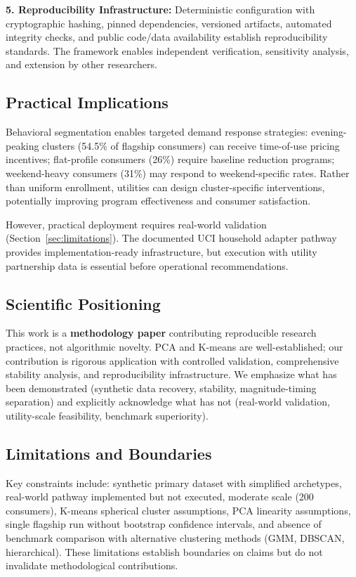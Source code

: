 \textbf{5. Reproducibility Infrastructure:} Deterministic configuration with cryptographic hashing, pinned dependencies, versioned artifacts, automated integrity checks, and public code/data availability establish reproducibility standards. The framework enables independent verification, sensitivity analysis, and extension by other researchers.

\subsection{Practical Implications}

Behavioral segmentation enables targeted demand response strategies: evening-peaking clusters (54.5\% of flagship consumers) can receive time-of-use pricing incentives; flat-profile consumers (26\%) require baseline reduction programs; weekend-heavy consumers (31\%) may respond to weekend-specific rates. Rather than uniform enrollment, utilities can design cluster-specific interventions, potentially improving program effectiveness and consumer satisfaction.

However, practical deployment requires real-world validation (Section~\ref{sec:limitations}). The documented UCI household adapter pathway provides implementation-ready infrastructure, but execution with utility partnership data is essential before operational recommendations.

\subsection{Scientific Positioning}

This work is a \textbf{methodology paper} contributing reproducible research practices, not algorithmic novelty. PCA and K-means are well-established; our contribution is rigorous application with controlled validation, comprehensive stability analysis, and reproducibility infrastructure. We emphasize what has been demonstrated (synthetic data recovery, stability, magnitude-timing separation) and explicitly acknowledge what has not (real-world validation, utility-scale feasibility, benchmark superiority).

\subsection{Limitations and Boundaries}

Key constraints include: synthetic primary dataset with simplified archetypes, real-world pathway implemented but not executed, moderate scale (200 consumers), K-means spherical cluster assumptions, PCA linearity assumptions, single flagship run without bootstrap confidence intervals, and absence of benchmark comparison with alternative clustering methods (GMM, DBSCAN, hierarchical). These limitations establish boundaries on claims but do not invalidate methodological contributions.

